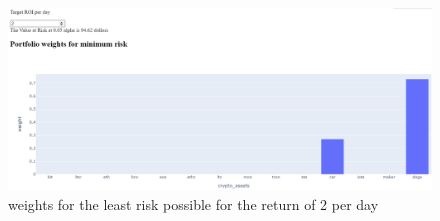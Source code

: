 \documentclass[final]{cvpr}
\begin{document}
\begin{figure}[h!]
\begin{center}
\includegraphics[width=0.8\linewidth]{latex/roi2.PNG}
\end{center}
   \caption{weights for the least risk possible for the return of 2 per day}
\label{fig:roi2}
\end{figure}
\end{document}
